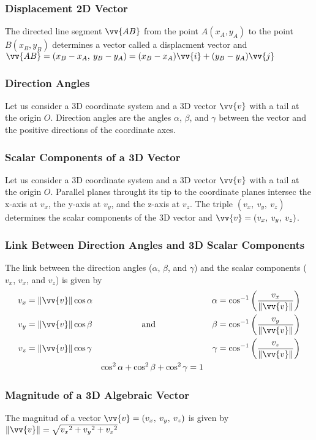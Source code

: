 \documentclass{article}
\newcommand{\mv}[1]{
	\lVert\vv{#1}\rVert
}
\begin{document}
	\subsubsection{Displacement 2D Vector}
	The directed line segment $\vv{AB}$ from the point $A(x_A, y_A)$ to the point $B(x_B, y_B)$ determines a vector called a displacment vector and $\vv{AB}=(x_B-x_A,\:y_B-y_A)=(x_B-x_A)\vv{i}+(y_B-y_A)\vv{j}$
	\subsubsection{Direction Angles}
	Let us consider a 3D coordinate system and a 3D vector $\vv{v}$ with a tail at the origin $O$. Direction angles are the angles $\alpha$, $\beta$, and $\gamma$ between the vector and the positive directions of the coordinate axes. %
	\subsubsection{Scalar Components of a 3D Vector}
	Let us consider a 3D coordinate system and a 3D vector $\vv{v}$ with a tail at the origin $O$. Parallel planes throught its tip to the coordinate planes intersec the x-axis at $v_x$, the y-axis at $v_y$, and the z-axis at $v_z$. The triple $(v_x,\:v_y,\:v_z)$ determines the scalar components of the 3D vector and $\vv{v}=(v_x,\:v_y,\:v_z)$. %
	\subsubsection{Link Between Direction Angles and 3D Scalar Components}
	The link between the direction angles ($\alpha$, $\beta$, and $\gamma$) and the scalar components ($v_x$, $v_x$, and $v_z$) is given by
	\begin{align*}
		v_x&=\mv{v}\cos\alpha&&&\alpha&=\cos^{-1}\left(\frac{v_x}{\mv{v}}\right)\\
		v_y&=\mv{v}\cos\beta&\text{and}&&\beta&=\cos^{-1}\left(\frac{v_y}{\mv{v}}\right)\\
		v_z&=\mv{v}\cos\gamma&&&\gamma&=\cos^{-1}\left(\frac{v_z}{\mv{v}}\right)\\
		&&\cos^2\alpha+\cos^2\beta&+\cos^2\gamma=1
	\end{align*}
	\subsubsection{Magnitude of a 3D Algebraic Vector}
	The magnitud of a vector $\vv{v}=(v_x,\:v_y,\:v_z)$ is given by $\mv{v}=\sqrt{{v_x}^2+{v_y}^2+{v_z}^2}$
\end{document}
